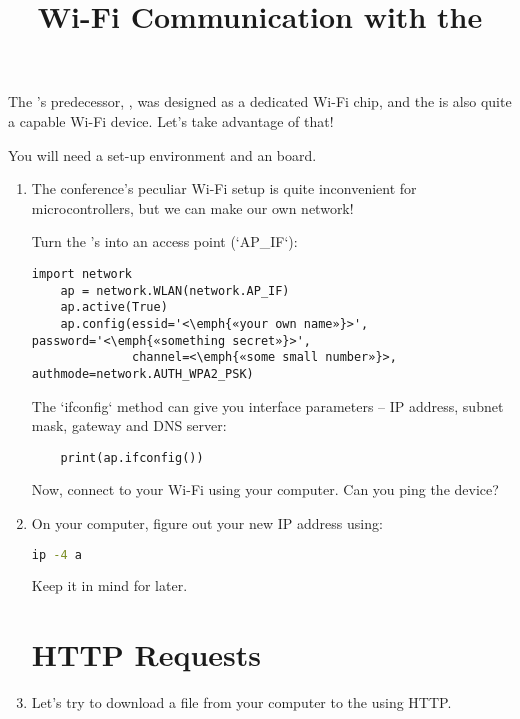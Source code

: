\documentclass{../tutorial}
\title{Wi-Fi Communication with the \abbr{ESP32}}
\begin{document}
    The 's predecessor, , was designed as a dedicated
    Wi-Fi chip,
    and the  is also quite a capable Wi-Fi device.
    Let's take advantage of that!

    You will need a set-up environment and an  board.

\begin{enumerate}

\item
    The conference's peculiar Wi-Fi setup is quite inconvenient for
    microcontrollers, but we can make our own network!

    Turn the 's into an access point (`AP_IF`):

    \begin{lstlisting}[escapeinside=<>]
    import network
    ap = network.WLAN(network.AP_IF)
    ap.active(True)
    ap.config(essid='<\emph{«your own name»}>', password='<\emph{«something secret»}>',
              channel=<\emph{«some small number»}>, authmode=network.AUTH_WPA2_PSK)
    \end{lstlisting}

    \begin{comment}
        Ideally, run `nmcli d wifi` on your computer to see occupied
        Wi-Fi channels, and pick a channel you don't see.
    \end{comment}

    The `ifconfig` method can give you interface parameters – IP address,
    subnet mask, gateway and DNS server:

    \begin{lstlisting}
    print(ap.ifconfig())
    \end{lstlisting}

    Now, connect to your Wi-Fi using your computer.
    Can you ping the device?

\item
    On your computer, figure out your new IP address using:

    \begin{lstlisting}[language=bash]
    ip -4 a
    \end{lstlisting}

    Keep it in mind for later.

\section{HTTP Requests}

\item
    Let's try to download a file from your computer to the 
    using HTTP.


\end{enumerate}
\end{document}
